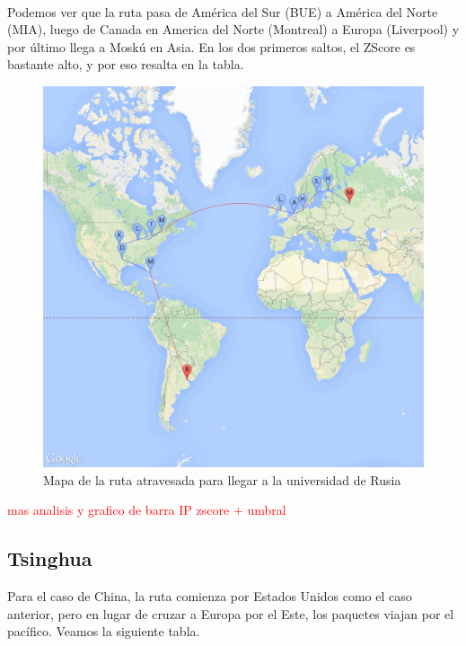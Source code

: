 ~

Podemos ver que la ruta pasa de Am\'erica del Sur (BUE) a Am\'erica del Norte (MIA), luego de Canada en America del Norte (Montreal) a Europa (Liverpool) y por \'ultimo llega a Mosk\'u en Asia. En los dos primeros saltos, el ZScore es bastante alto, y por eso resalta en la tabla. 

\begin{figure}[H]
	\begin{center}
		  \includegraphics[scale=0.25]{../results/maps/MSU.png}
		  \caption{Mapa de la ruta atravesada para llegar a la universidad de Rusia}
	\end{center}
\end{figure}

\textcolor{red}{mas analisis y grafico de barra IP zscore + umbral}

\subsection{Tsinghua}

Para el caso de China, la ruta comienza por Estados Unidos como el caso anterior, pero en lugar de cruzar a Europa por el Este, los paquetes viajan por el pac\'ifico.
Veamos la siguiente tabla.

~

